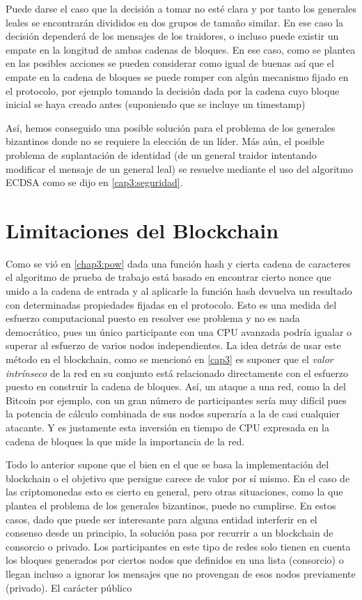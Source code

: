 Puede darse el caso que la decisión a tomar no esté clara y por tanto los generales leales se encontrarán divididos en dos grupos de tamaño similar. En ese caso la decisión dependerá de los mensajes de los traidores, o incluso puede existir un empate en la longitud de ambas cadenas de bloques. En ese caso, como se plantea en \citep{byzantine_generals} las posibles acciones se pueden considerar como igual de buenas así que el empate en la cadena de bloques se puede romper con algún mecanismo fijado en el protocolo, por ejemplo tomando la decisión dada por la cadena cuyo bloque inicial se haya creado antes (suponiendo que se incluye un timestamp)

Así, hemos conseguido una posible solución para el problema de los generales bizantinos donde no se requiere la elección de un líder. Más aún, el posible problema de suplantación de identidad (de un general traidor intentando modificar el mensaje de un general leal) se resuelve mediante el uso del algoritmo ECDSA como se dijo en \ref{cap3:seguridad}.
\section{Limitaciones del Blockchain}
Como se vió en \ref{chap3:pow} dada una función hash y cierta cadena de caracteres el algoritmo de prueba de trabajo está basado en encontrar cierto nonce que unido a la cadena de entrada y al aplicarle la función hash devuelva un resultado con determinadas propiedades fijadas en el protocolo. Esto es una medida del esfuerzo computacional puesto en resolver ese problema y no es nada democrático, pues un único participante con una CPU avanzada podría igualar o superar al esfuerzo de varios nodos independientes. La idea detrás de usar este método en el blockchain, como se mencionó en \ref{cap3} es suponer que el \textit{valor intrínseco} de la red en su conjunto está relacionado directamente con el esfuerzo puesto en construir la cadena de bloques. Así, un ataque a una red, como la del Bitcoin por ejemplo, con un gran número de participantes sería muy difícil pues la potencia de cálculo combinada de sus nodos superaría a la de casi cualquier atacante. Y es justamente esta inversión en tiempo de CPU expresada en la cadena de bloques la que mide la importancia de la red.

Todo lo anterior supone que el bien en el que se basa la implementación del blockchain o el objetivo que persigue carece de valor por sí mismo. En el caso de las criptomonedas esto es cierto en general, pero otras situaciones, como la que plantea el problema de los generales bizantinos, puede no cumplirse.
En estos casos, dado que puede ser interesante para alguna entidad interferir en el consenso desde un principio, la solución pasa por recurrir a un blockchain de consorcio o privado. Los participantes en este tipo de redes solo tienen en cuenta los bloques generados por ciertos nodos que definidos en una lista (consorcio) o llegan incluso a ignorar los mensajes que no provengan de esos nodos previamente (privado). El carácter público


